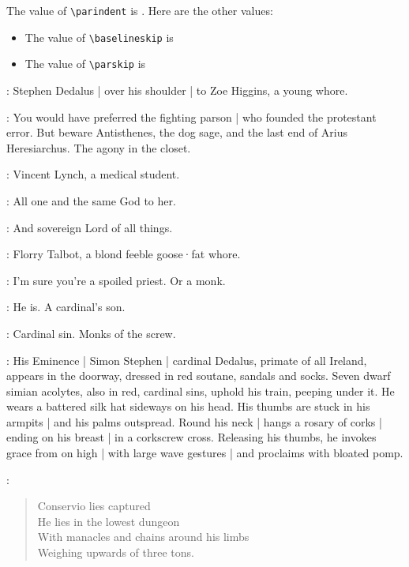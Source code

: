 
The value of \verb|\parindent| is \texttt{\the\parindent}. Here are the other values:

\begin{itemize}
\item The value of \verb|\baselineskip| is \texttt{\the\baselineskip}
\item The value of \verb|\parskip| is \texttt{\the\parskip}
\end{itemize}

:
Stephen Dedalus |
over his shoulder |
to Zoe Higgins,
a young whore.

\Stephen:
You would have preferred the fighting parson |
who founded the protestant error.
But beware Antisthenes,
the dog sage,
and the last end of Arius Heresiarchus.
The agony in the closet.

:
Vincent Lynch,
a medical student.

\Lynch:
All one and the same God to her.

\Stephen:
And sovereign Lord of all things.

:
Florry Talbot,
a blond feeble goose·fat whore.

\Florry:
I'm sure you're a spoiled priest.
Or a monk.

\Lynch:
He is.
A cardinal's son.

\Stephen:
Cardinal sin.
Monks of the screw.

:
His Eminence |
Simon Stephen |
cardinal Dedalus,
primate of all Ireland,
appears in the doorway,
dressed in red soutane,
sandals and socks.
Seven dwarf simian acolytes,
also in red,
cardinal sins,
uphold his train,
peeping under it.
He wears a battered silk hat sideways on his head.
His thumbs are stuck in his armpits |
and his palms outspread.
Round his neck |
hangs a rosary of corks |
ending on his breast |
in a corkscrew cross.
%
Releasing his thumbs,
he invokes grace from on high |
with large wave gestures |
and proclaims with bloated pomp.

\Cardinal:
\begin{verse}
    Conservio lies captured\\
    He lies in the lowest dungeon\\
    With manacles and chains around his limbs\\
    Weighing upwards of three tons.
\end{verse}

